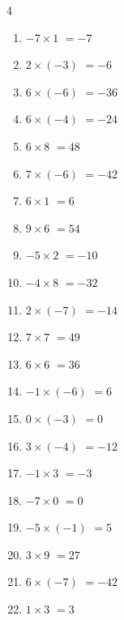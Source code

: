 \begin{multicols}{4}
\begin{enumerate}
  \item $-7\times 1$
        $=-7$

  \item $2\times (-3)$
        $=-6$

  \item $6\times (-6)$
        $=-36$

  \item $6\times (-4)$
        $=-24$

\columnbreak %

\resetques

  \item $6\times 8$
        $=48$

  \item $7\times (-6)$
        $=-42$

  \item $6\times 1$
        $=6$

  \item $9\times 6$
        $=54$

  \item $-5\times 2$
        $=-10$

  \item $-4\times 8$
        $=-32$

  \item $2\times (-7)$
        $=-14$

  \item $7\times 7$
        $=49$

  \item $6\times 6$
        $=36$

  \item $-1\times (-6)$
        $=6$

  \item $0\times (-3)$
        $=0$

  \item $3\times (-4)$
        $=-12$

  \item $-1\times 3$
        $=-3$

  \item $-7\times 0$
        $=0$

  \item $-5\times (-1)$
        $=5$

  \item $3\times 9$
        $=27$

  \item $6\times (-7)$
        $=-42$

  \item $1\times 3$
        $=3$


\end{enumerate}
\end{multicols}
